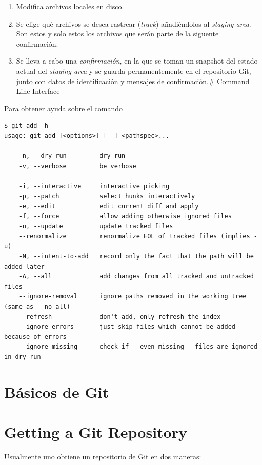 \documentclass[spanish, 12pt, a4paper]{article}
\begin{document}
\begin{enumerate}
\def\labelenumi{\arabic{enumi}.}
\item
  Modifica archivos locales en disco.
\item
  Se elige qué archivos se desea rastrear (\emph{track}) añadiéndolos al
  \emph{staging area}. Son estos y solo estos los archivos que serán
  parte de la siguente confirmación.
\item
  Se lleva a cabo una \emph{confirmación}, en la que se toman un
  snapshot del estado actual del \emph{staging area} y se guarda
  permanentemente en el repositorio Git, junto con datos de
  identificación y mensajes de confirmación.\# Command Line Interface
\end{enumerate}

Para obtener ayuda sobre el comando

\begin{lstlisting}
$ git add -h
usage: git add [<options>] [--] <pathspec>...

    -n, --dry-run         dry run
    -v, --verbose         be verbose

    -i, --interactive     interactive picking
    -p, --patch           select hunks interactively
    -e, --edit            edit current diff and apply
    -f, --force           allow adding otherwise ignored files
    -u, --update          update tracked files
    --renormalize         renormalize EOL of tracked files (implies -u)
    -N, --intent-to-add   record only the fact that the path will be added later
    -A, --all             add changes from all tracked and untracked files
    --ignore-removal      ignore paths removed in the working tree (same as --no-all)
    --refresh             don't add, only refresh the index
    --ignore-errors       just skip files which cannot be added because of errors
    --ignore-missing      check if - even missing - files are ignored in dry run
\end{lstlisting}

\section{Básicos de Git}

\section{Getting a Git Repository}

Usualmente uno obtiene un repositorio de Git en dos maneras:
\end{document}
